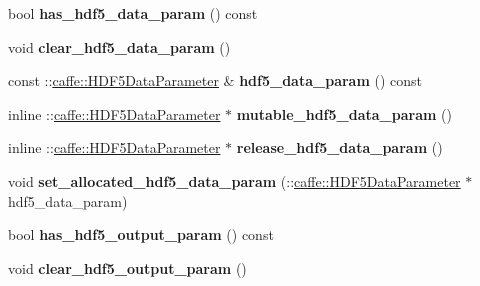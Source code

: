 \begin{DoxyCompactItemize}
\item 
\mbox{\label{classcaffe_1_1_layer_parameter_aea8826b1a38c01804f1d4bd3f5eb0080}} 
bool {\bfseries has\+\_\+hdf5\+\_\+data\+\_\+param} () const
\item 
\mbox{\label{classcaffe_1_1_layer_parameter_a3fa058a9cd3e206cb10e6f126f85cd73}} 
void {\bfseries clear\+\_\+hdf5\+\_\+data\+\_\+param} ()
\item 
\mbox{\label{classcaffe_1_1_layer_parameter_a654895f2e382398d0f1d3218ca9ac10e}} 
const \+::\mbox{\hyperlink{classcaffe_1_1_h_d_f5_data_parameter}{caffe\+::\+H\+D\+F5\+Data\+Parameter}} \& {\bfseries hdf5\+\_\+data\+\_\+param} () const
\item 
\mbox{\label{classcaffe_1_1_layer_parameter_a6d0effe21ede64aa5bea810760c3d589}} 
inline \+::\mbox{\hyperlink{classcaffe_1_1_h_d_f5_data_parameter}{caffe\+::\+H\+D\+F5\+Data\+Parameter}} $\ast$ {\bfseries mutable\+\_\+hdf5\+\_\+data\+\_\+param} ()
\item 
\mbox{\label{classcaffe_1_1_layer_parameter_a49b5781a4c80ac0b0c951a0d71896895}} 
inline \+::\mbox{\hyperlink{classcaffe_1_1_h_d_f5_data_parameter}{caffe\+::\+H\+D\+F5\+Data\+Parameter}} $\ast$ {\bfseries release\+\_\+hdf5\+\_\+data\+\_\+param} ()
\item 
\mbox{\label{classcaffe_1_1_layer_parameter_a9f0867bd7a30afcb9b67e1bd5a743c2c}} 
void {\bfseries set\+\_\+allocated\+\_\+hdf5\+\_\+data\+\_\+param} (\+::\mbox{\hyperlink{classcaffe_1_1_h_d_f5_data_parameter}{caffe\+::\+H\+D\+F5\+Data\+Parameter}} $\ast$hdf5\+\_\+data\+\_\+param)
\item 
\mbox{\label{classcaffe_1_1_layer_parameter_a0af0da719baafa467bf1007a12e051a0}} 
bool {\bfseries has\+\_\+hdf5\+\_\+output\+\_\+param} () const
\item 
\mbox{\label{classcaffe_1_1_layer_parameter_a747caef20ba4c8ef7e1e3fec350166b9}} 
void {\bfseries clear\+\_\+hdf5\+\_\+output\+\_\+param} ()
\item 

\end{DoxyCompactItemize}
